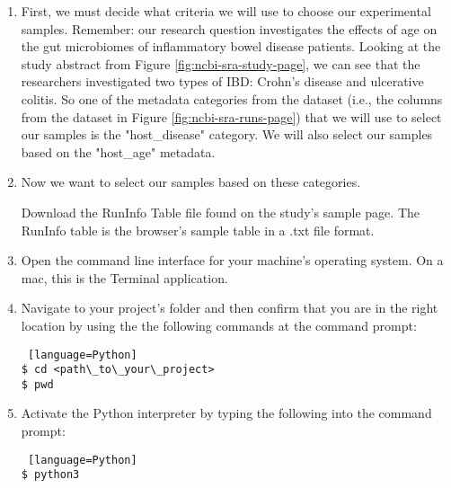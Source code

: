         \begin{enumerate}
            \item First, we must decide what criteria we will use to choose our experimental samples. 
            \newline
            Remember: our research question investigates the effects of age on the gut microbiomes of inflammatory bowel disease patients. Looking at the study abstract from Figure \ref{fig:ncbi-sra-study-page}, we can see that the researchers investigated two types of IBD: Crohn's disease and ulcerative colitis. So one of the metadata categories from the dataset (i.e., the columns from the dataset in Figure \ref{fig:ncbi-sra-runs-page}) that we will use to select our samples is the "host\_disease" category. We will also select our samples based on the "host\_age" metadata.
            
            \item Now we want to select our samples based on these categories. 
            
            Download the RunInfo Table file found on the study's sample page. The RunInfo table is the browser's sample table in a .txt file format.
            
            \item Open the command line interface for your machine's operating system. On a mac, this is the Terminal application. 
            
            \item Navigate to your project's folder and then confirm that you are in the right location by using the the following commands at the command prompt:
            
                \begin{lstlisting} [language=Python]
$ cd <path\_to\_your\_project>
$ pwd
                \end{lstlisting}
                        
            \item Activate the Python interpreter by typing the following into the command prompt:
                \begin{lstlisting} [language=Python]
$ python3
                \end{lstlisting}
            

\end{enumerate}
